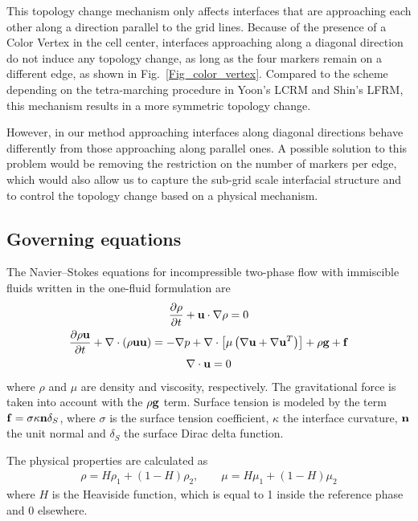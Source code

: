 This topology change mechanism only affects interfaces that are approaching each other along a direction parallel to the grid lines. Because of the presence of a Color Vertex in the cell center, interfaces approaching along a diagonal direction do not induce any topology change, as long as the four markers remain on a different edge, as shown in Fig.~\ref{Fig_color_vertex}. Compared to the scheme depending on the tetra-marching procedure in Yoon's \cite{Yoon_2010_08} LCRM and Shin's \cite{Shin_2011_230} LFRM, this mechanism results in a more symmetric topology change.

However, in our method approaching interfaces along diagonal directions behave
differently from those approaching along parallel ones. A possible solution to this problem would be removing the restriction on the number of markers per edge, which would also allow us to capture the sub-grid scale interfacial structure and to control the topology change based on a physical mechanism. 


\subsection{Governing equations}

The Navier--Stokes equations for incompressible two-phase flow with immiscible fluids written in the one-fluid formulation are
\begin{gather}
\frac{\partial \rho}{\partial t}
+ {\bf u} \cdot \nabla \rho= 0 \\
\frac{\partial \rho {\bf u}}{\partial t}
+ \nabla \cdot (\rho {\bf u}{\bf u}) = 
-\nabla p + \nabla \cdot \left[ \mu \left( \nabla {\bf u} + \nabla {\bf u}^T\right) \right] + \rho {\bf g} + {\bf f}
\label{Eq:NS}
\\
\nabla \cdot {\bf u} = 0
\end{gather}
\noindent where $\rho$ and $\mu$ are density and viscosity, respectively. The gravitational force is taken into account with the $\rho {\bf g}$ term. Surface tension is modeled by the term ${\bf f} = \sigma \kappa {\bf n} \delta_S$, where $\sigma$ is the surface tension coefficient, $\kappa$ the interface curvature, ${\bf n}$ the unit normal and $\delta_S$ the surface Dirac delta function. 

The physical properties are calculated as
\begin{gather}
\rho = H \rho_1 + (1 - H) \rho_2, \qquad \mu = H \mu_1 + (1 - H) \mu_2
\label{Eq:physical}
\end{gather}
where $H$ is the Heaviside function, which is equal to 1 inside the reference phase and 0 elsewhere.


